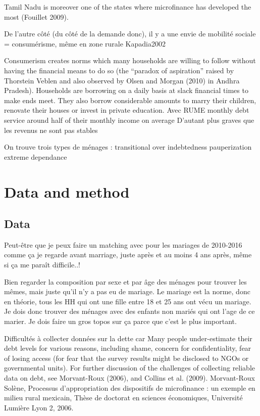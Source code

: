 \documentclass[a4paper, 11pt, onecolumn]{article}
\begin{document}
Tamil Nadu is
moreover one of the states where microfinance has developed the most (Fouillet 2009).

De l'autre côté (du côté de la demande donc), il y a une envie de mobilité sociale = consumérisme, même en zone rurale Kapadia2002

Consumerism creates norms which many households are
willing to follow without having the financial means to do so (the “paradox of aspiration”
raised by Thorstein Veblen and also observed by Olsen and Morgan (2010) in Andhra
Pradesh). Households are borrowing on a daily basis at slack financial times to make ends
meet. They also borrow considerable amounts to marry their children, renovate their houses
or invest in private education. 
Avec RUME monthly debt service around half of their monthly income on average
D'autant plus graves que les revenus ne sont pas stables

On trouve trois types de ménages : 
transitional over indebtedness
pauperization
extreme dependance








\section{Data and method}
\cite{NEEMSISreport}
\cite{NEEMSIS2017}

\subsection{Data}
Peut-être que je peux faire un matching avec pour les mariages de 2010-2016 comme ça je regarde avant marriage, juste après et au moins 4 ans après, même si ça me paraît difficile..!

Bien regarder la composition par sexe et par âge des ménages pour trouver les mêmes, mais juste qu'il n'y a pas eu de mariage.
Le mariage est la norme, donc en théorie, tous les HH qui ont une fille entre 18 et 25 ans ont vécu un mariage.
Je dois donc trouver des ménages avec des enfants non mariés qui ont l'age de ce marier.
Je dois faire un gros topos sur ça parce que c'est le plus important.


\cite{Guerin2014a} Difficultés à collecter données sur la dette car Many people under-estimate their debt levels for various reasons, including shame, concern for confidentiality,
fear of losing access (for fear that the survey results might be disclosed to NGOs or governmental units). For
further discussion of the challenges of collecting reliable data on debt, see Morvant-Roux (2006), and Collins et
al. (2009).
Morvant-Roux Solène, Processus d’appropriation des dispositifs de microfinance : un exemple en milieu
rural mexicain, Thèse de doctorat en sciences économiques, Université Lumière Lyon 2, 2006.
\end{document}
